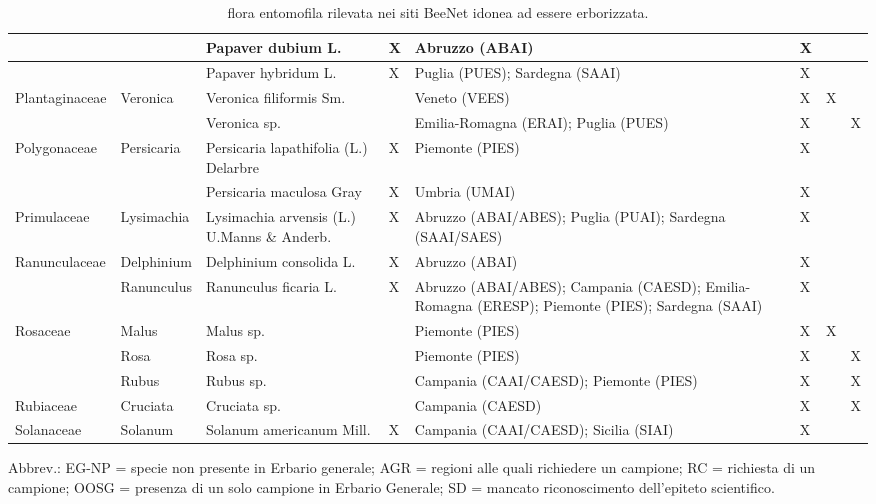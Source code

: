 \documentclass[main.tex]{subfiles}
\begin{document}
    \clearpage
        
        \begin{table}[!ht]
        \centering
    \begin{tabular}[\footnotesize]{|p{2.2cm}|p{2.2cm}|p{2.2cm}|p{1.1cm}|p{1.6cm}|p{0.8cm}|p{1cm}|p{0.8cm}|}
    \hline
    ~ & ~ & Papaver dubium L. & X & Abruzzo (ABAI) & X & ~ & ~ \\ \hline
        ~ & ~ & Papaver hybridum L. & X & Puglia (PUES); Sardegna (SAAI) & X & ~ & ~ \\ \hline
        Plantaginaceae & Veronica & Veronica filiformis Sm. & ~ & Veneto (VEES) & X & X & ~ \\ \hline
        ~ & ~ & Veronica sp. & ~ & Emilia-Romagna (ERAI); Puglia (PUES) & X & ~ & X \\ \hline
        Polygonaceae & Persicaria & Persicaria lapathifolia (L.) Delarbre & X & Piemonte (PIES) & X & ~ & ~ \\ \hline
        ~ & ~ & Persicaria maculosa Gray & X & Umbria (UMAI) & X & ~ & ~ \\ \hline
        Primulaceae & Lysimachia & Lysimachia arvensis (L.) U.Manns \& Anderb. & X & Abruzzo (ABAI/ABES); Puglia (PUAI); Sardegna (SAAI/SAES) & X & ~ & ~ \\ \hline
        Ranunculaceae & Delphinium & Delphinium consolida L. & X & Abruzzo (ABAI) & X & ~ & ~ \\ \hline
        ~ & Ranunculus & Ranunculus ficaria L. & X & Abruzzo (ABAI/ABES); Campania (CAESD); Emilia-Romagna (ERESP); Piemonte (PIES); Sardegna (SAAI) & X & ~ & ~ \\ \hline
        Rosaceae & Malus & Malus sp. & ~ & Piemonte (PIES) & X & X & ~ \\ \hline
        ~ & Rosa & Rosa sp. & ~ & Piemonte (PIES) & X & ~ & X \\ \hline
        ~ & Rubus & Rubus sp. & ~ & Campania (CAAI/CAESD); Piemonte (PIES) & X & ~ & X \\ \hline
        Rubiaceae & Cruciata & Cruciata sp. & ~ & Campania (CAESD) & X & ~ & X \\ \hline
        Solanaceae & Solanum & Solanum americanum Mill. & X & Campania (CAAI/CAESD); Sicilia (SIAI) & X & ~ & ~ \\ \hline
    \end{tabular}
        \caption{flora entomofila rilevata nei siti BeeNet idonea ad essere erborizzata.}
    \label{tab:10}
\end{table}

\clearpage

Abbrev.: EG-NP = specie non presente in Erbario generale; AGR = regioni alle quali richiedere un campione; RC = richiesta di un campione; OOSG = presenza di un solo campione in Erbario Generale; SD = mancato riconoscimento dell’epiteto scientifico.

\clearpage
\end{document}

